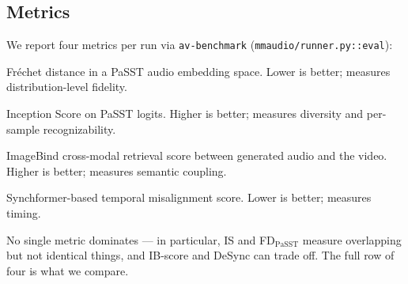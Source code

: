\subsection{Metrics}
We report four metrics per run via \texttt{av-benchmark}
(\texttt{mmaudio/runner.py::eval}):
\begin{description}[leftmargin=2em]
  \item[FD$_{\text{PaSST}}$] Fr\'echet distance in a PaSST audio
    embedding space. Lower is better; measures distribution-level
    fidelity.
  \item[IS] Inception Score on PaSST logits. Higher is better;
    measures diversity and per-sample recognizability.
  \item[IB-score] ImageBind
    \citep{girdhar2023imagebind} cross-modal retrieval score
    between generated audio and the video. Higher is better;
    measures semantic coupling.
  \item[DeSync] Synchformer-based temporal misalignment score.
    Lower is better; measures timing.
\end{description}
No single metric dominates --- in particular, IS and
FD$_{\text{PaSST}}$ measure overlapping but not identical things,
and IB-score and DeSync can trade off. The full row of four is
what we compare.

